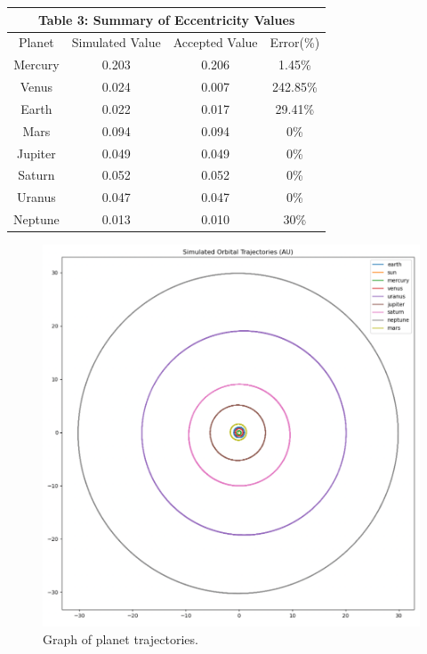 \documentclass[a4paper,12pt]{article} %
\numberwithin{equation}{section} %
\numberwithin{figure}{section} %
\begin{document}
\begin{table}[h]
\centering
\begin{tabular}{|c|c|c|c|}
\hline
\multicolumn{4}{|c|}{\textbf{Table 3:} Summary of Eccentricity Values}\\
\hline
Planet & Simulated Value & Accepted Value & Error(\%)\\
\hline
Mercury & 0.203 & 0.206 & 1.45\%\\
\hline
Venus & 0.024 & 0.007 & 242.85\%\\
\hline
Earth & 0.022 & 0.017 & 29.41\%\\
\hline
Mars & 0.094 & 0.094 & 0\%\\
\hline
Jupiter & 0.049 & 0.049 & 0\%\\
\hline
Saturn & 0.052 & 0.052 & 0\%\\
\hline
Uranus & 0.047 & 0.047 & 0\%\\
\hline
Neptune & 0.013 & 0.010 & 30\%\\
\hline
\end{tabular}
\end{table}


\begin{figure}[h]
  \centering
  \includegraphics[scale=0.4]{Trajectory.png}
  \caption{Graph of planet trajectories.}
\end{figure}
\end{document}
